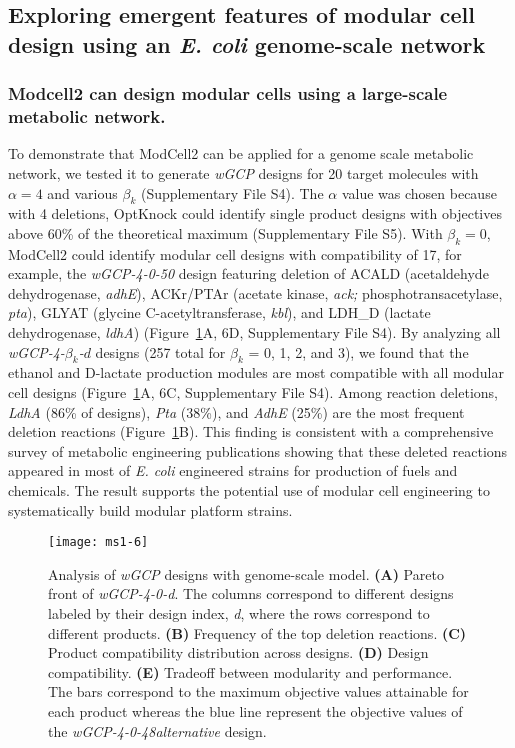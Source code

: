 \subsection{Exploring emergent features of modular cell design using an \textit{E. coli} genome-scale network}

\subsubsection{Modcell2 can design modular cells using a large-scale
metabolic network.}
To demonstrate that ModCell2 can be applied for a
genome scale metabolic network, we tested it to generate \emph{wGCP}
designs for 20 target molecules with \(\alpha = 4\) and various
\(\beta_{k}\) (Supplementary File S4). The \(\alpha\) value was chosen
because with 4 deletions, OptKnock could identify single product designs
with objectives above 60\% of the theoretical maximum (Supplementary
File S5). With \(\beta_{k} = 0\), ModCell2 could identify modular cell
designs with compatibility of 17, for example, the \emph{wGCP-4-0-50}
design featuring deletion of ACALD (acetaldehyde dehydrogenase,
\emph{adhE}), ACKr/PTAr (acetate kinase, \emph{ack;}
phosphotransacetylase, \emph{pta}), GLYAT (glycine C-acetyltransferase,
\emph{kbl}), and LDH\_D (lactate dehydrogenase, \emph{ldhA}) (Figure~\ref{fig:ms1-fig6}A,
6D, Supplementary File S4). By analyzing all
\emph{wGCP-4-}\(\beta_{k}\)\emph{-}\(d\) designs (257 total for
\(\beta_{k}\) = 0, 1, 2, and 3), we found that the ethanol and D-lactate
production modules are most compatible with all modular cell designs
(Figure~\ref{fig:ms1-fig6}A, 6C, Supplementary File S4). Among reaction deletions,
\emph{LdhA} (86\% of designs), \emph{Pta} (38\%), and \emph{AdhE} (25\%)
are the most frequent deletion reactions (Figure~\ref{fig:ms1-fig6}B). This finding is
consistent with a comprehensive survey of metabolic engineering
publications \citep{winkler2015} showing that these deleted
reactions appeared in most of \emph{E. coli} engineered strains for
production of fuels and chemicals. The result supports the potential use
of modular cell engineering to systematically build modular platform
strains.

\begin{figure}[!bp]
  \centering
  \texttt{[image: ms1-6]}
    \caption[Analysis of \emph{wGCP} designs with genome-scale model]{
 Analysis of \emph{wGCP} designs with genome-scale model. \textbf{(A)} Pareto front of \emph{wGCP-4-0-d}. The
columns correspond to different designs labeled by their design index,
\emph{d}, where the rows correspond to different products. \textbf{(B)}
Frequency of the top deletion reactions. \textbf{(C)} Product
    compatibility distribution across designs. \textbf{(D)} Design
compatibility. \textbf{(E)} Tradeoff between modularity and performance.
The bars correspond to the maximum objective values attainable for each
product whereas the blue line represent the objective values of the
\emph{wGCP-4-0-48alternative} design.
    }
    \label{fig:ms1-fig6}
\end{figure}

